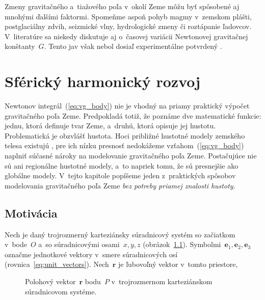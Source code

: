 \documentclass[a4paper, 12pt]{book}
\let\vec\mathbf
\begin{document}
Zmeny gravitačného a~tiažového poľa v~okolí Zeme môžu byť spôsobené aj mnohými 
ďalšími faktormi.  Spomeňme aspoň pohyb magmy v~zemskom plášti, postglaciálny 
zdvih, seizmické vlny, hydrologické zmeny či roztápanie ľadovcov.  V~literatúre 
sa niekedy diskutuje aj o~časovej variácii Newtonovej gravitačnej 
konštanty~$G$.  Tento jav však nebol dosiaľ experimentálne potvrdený 
\parencite{Torge1989}.







\chapter{Sférický harmonický rozvoj}
\label{sec:spherical_harmonic_expansion}

Newtonov integrál~(\ref{eq:vg_body}) nie je vhodný na priamy praktický výpočet 
gravitačného poľa Zeme.  Predpokladá totiž, že poznáme dve matematické funkcie: 
jednu, ktorá definuje tvar Zeme, a~druhú, ktorá opisuje jej hustotu.  
Problematická je obzvlášť hustota.  Hoci približné hustotné modely zemského 
telesa existujú \parencite[napríklad][]{Dziewonski1981}, pre ich nízku presnosť 
nedokážeme vzťahom~(\ref{eq:vg_body}) naplniť súčasné nároky na modelovanie 
gravitačného poľa Zeme.  Postačujúce nie sú ani regionálne hustotné modely, 
a~to napriek tomu, že sú presnejšie ako globálne modely.  V~tejto kapitole 
popíšeme jeden z~praktických spôsobov modelovania gravitačného poľa Zeme 
\emph{bez potreby priamej znalosti hustoty}.






\section{Motivácia}
\label{sec:sh_motivation}

Nech je daný trojrozmerný karteziánsky súradnicový systém so začiatkom 
v~bode~$O$ a~so súradnicovými osami~$x, y, z$ (obrázok~\ref{fig:unit_vectors}).  
Symbolmi~$\vec e_1, \vec e_2, \vec e_3$ označme jednotkové vektory v~smere 
súradnicových osí (rovnica~\ref{eq:unit_vectors}).  Nech~$\vec r$ je ľubovoľný 
vektor v~tomto priestore,
%
\begin{figure}
\centering

\caption{Polohový vektor~$\vec r$ bodu~$P$ v~trojrozmernom karteziánskom 
súradnicovom systéme.}
\label{fig:unit_vectors}
\end{figure}
\end{document}
